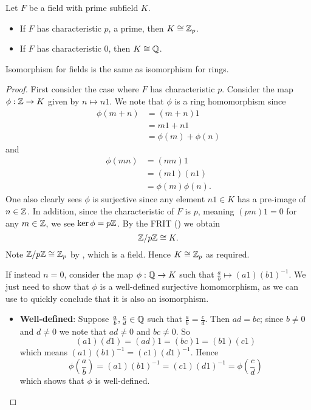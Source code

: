 \begin{theorem}\label{thrm-prime-subfield-isomorphic-to-Zp-or-Q}
    Let $F$ be a field with prime subfield $K$.
    \begin{itemize}
        \item If $F$ has characteristic $p$, a prime, then $K \cong \mathbb{Z}_p$.
        \item If $F$ has characteristic 0, then $K \cong \mathbb{Q}$.
    \end{itemize}
\end{theorem}
\begin{remark}
    Isomorphism for fields is the same as isomorphism for rings.
\end{remark}
\begin{proof}
    First consider the case where $F$ has characteristic $p$. Consider the map $\phi: \mathbb{Z} \to K$ given by $n \mapsto n1$. We note that $\phi$ is a ring homomorphism since
    \begin{align*}
        \phi(m + n) &= (m + n)1\\
        &= m1 + n1\\
        &= \phi(m) + \phi(n)
    \end{align*}
    and
    \begin{align*}
        \phi(mn) &= (mn)1\\
        &= (m1)(n1)\\
        &= \phi(m)\phi(n).
    \end{align*}
    One also clearly sees $\phi$ is surjective since any element $n1 \in K$ has a pre-image of $n \in \mathbb{Z}$. In addition, since the characteristic of $F$ is $p$, meaning $(pm)1 = 0$ for any $m \in \mathbb{Z}$, we see $\ker\phi = p\mathbb{Z}$. By the FRIT () we obtain
    \[
        \mathbb{Z}/p\mathbb{Z} \cong K.
    \]
    Note $\mathbb{Z}/p\mathbb{Z} \cong \mathbb{Z}_p$ by , which is a field. Hence $K \cong \mathbb{Z}_p$ as required.

    If instead $n = 0$, consider the map $\phi: \mathbb{Q} \to K$ such that $\frac ab \mapsto (a1)(b1)^{-1}$. We just need to show that $\phi$ is a well-defined surjective homomorphism, as we can use  to quickly conclude that it is also an isomorphism.

    \begin{itemize}
        \item \textbf{Well-defined}: Suppose $\frac ab, \frac cd \in \mathbb{Q}$ such that $\frac ab = \frac cd$. Then $ad = bc$; since $b \neq 0$ and $d \neq 0$ we note that $ad \neq 0$ and $bc \neq 0$. So
        \[
            (a1)(d1) = (ad)1 = (bc)1 = (b1)(c1)
        \]
        which means $(a1)(b1)^{-1} = (c1)(d1)^{-1}$. Hence
        \[
            \phi\left(\frac ab\right) = (a1)(b1)^{-1} = (c1)(d1)^{-1} = \phi\left(\frac cd\right)
        \]
        which shows that $\phi$ is well-defined.


\end{itemize}
\end{proof}
